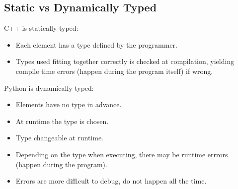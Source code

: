 \subsection{Static vs Dynamically Typed}
C++ is statically typed:
\begin{itemize}
    \item Each element has a type defined by the programmer.
    \item Types used fitting together correctly is checked at compilation, yielding compile time errors (happen during the program itself) if wrong.
\end{itemize}
Python is dynamically typed:
\begin{itemize}
    \item Elements have no type in advance.
    \item At runtime the type is chosen.
    \item Type changeable at runtime.
    \item Depending on the type when executing, there may be runtime errrors (happen during the program).
    \item Errors are more difficult to debug, do not happen all the time.
\end{itemize}
